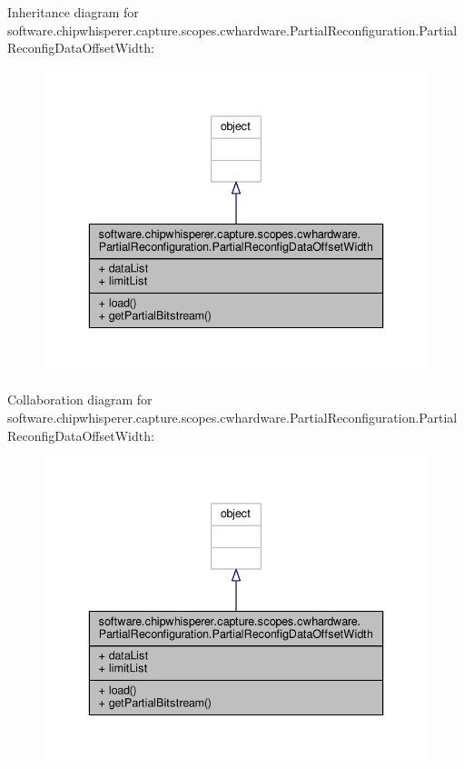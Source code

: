 Inheritance diagram for software.\+chipwhisperer.\+capture.\+scopes.\+cwhardware.\+Partial\+Reconfiguration.\+Partial\+Reconfig\+Data\+Offset\+Width\+:\nopagebreak
\begin{figure}[H]
\begin{center}
\leavevmode
\includegraphics[width=336pt]{d2/d01/classsoftware_1_1chipwhisperer_1_1capture_1_1scopes_1_1cwhardware_1_1PartialReconfiguration_1_1P553360a63dac29d00dea22145ca92aec}
\end{center}
\end{figure}


Collaboration diagram for software.\+chipwhisperer.\+capture.\+scopes.\+cwhardware.\+Partial\+Reconfiguration.\+Partial\+Reconfig\+Data\+Offset\+Width\+:\nopagebreak
\begin{figure}[H]
\begin{center}
\leavevmode
\includegraphics[width=336pt]{d8/d8f/classsoftware_1_1chipwhisperer_1_1capture_1_1scopes_1_1cwhardware_1_1PartialReconfiguration_1_1P6c67a9eb11b497f4da107952c4d4b5c6}
\end{center}
\end{figure}


